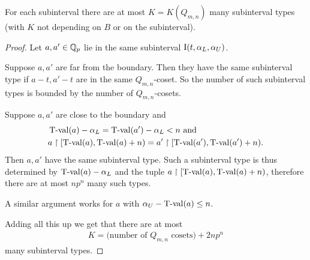 \documentclass{amsart}
\begin{document}
\begin{Lemma} \label{interval_type_count}
  For each subinterval there are at most $K = K(Q_{m,n})$ many subinterval types 
  (with $K$ not depending on $B$ or on the subinterval).  
\end{Lemma}

\begin{proof}
  Let $a, a' \in \mathbb{Q}_p$ lie in the same subinterval $\operatorname{I}(t, \alpha_L, \alpha_U)$.

  Suppose $a, a'$ are far from the boundary.
  Then they have the same subinterval type if $a - t, a' - t$ are in the same $Q_{m,n}$-coset.
  So the number of such subinterval types is bounded by the number of $Q_{m,n}$-cosets.

  Suppose $a, a'$ are close to the boundary and
  \begin{align*}
    &\operatorname{T-val}(a) - \alpha_L = \operatorname{T-val}(a') - \alpha_L < n \text { and}\\
    &a \upharpoonright [\operatorname{T-val}(a), \operatorname{T-val}(a) + n) = a' \upharpoonright [\operatorname{T-val}(a'), \operatorname{T-val}(a') + n).
  \end{align*}
  Then $a, a'$ have the same subinterval type.
  Such a subinterval type is thus determined by $\operatorname{T-val}(a) - \alpha_L$ and the tuple $a \upharpoonright [\operatorname{T-val}(a), \operatorname{T-val}(a) + n)$,
  therefore there are at most $n p^n$ many such types.

  A similar argument works for $a$ with $\alpha_U - \operatorname{T-val}(a) \leq n$.

  Adding all this up we get that there are at most
  \begin{align*}
    K = \text{(number of $Q_{m,n}$ cosets)} + 2 n p^n  
  \end{align*}
  many subinterval types.
\end{proof}
\end{document}
